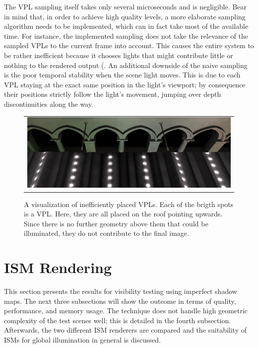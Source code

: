 The VPL sampling itself takes only several microseconds and is negligible. Bear in mind that, in order to achieve high quality levels, a more elaborate sampling algorithm needs to be implemented, which can in fact take most of the available time. For instance, the implemented sampling does not take the relevance of the sampled VPLs to the current frame into account. This causes the entire system to be rather inefficient because it chooses lights that might contribute little or nothing to the rendered output (. An additional downside of the naive sampling is the poor temporal stability when the scene light moves. This is due to each VPL staying at the exact same position in the light's viewport; by consequence their positions strictly follow the light's movement, jumping over depth discontinuities along the way.

\begin{figure}[htb]
\centering
  \begin{tabular}{@{}c@{}}
    \includegraphics[width=1.0\textwidth]{screenshots/RSM_unfavorable} \\
  \end{tabular}
  \caption{A visualization of inefficiently placed VPLs. Each of the brigth spots is a VPL. Here, they are all placed on the roof pointing upwards. Since there is no further geometry above them that could be illuminated, they do not contribute to the final image.}
  \label{fig:results:RSMUnfavorable}
\end{figure}




\section{ISM Rendering}
\label{sec:results:ism}

This section presents the results for visibility testing using imperfect shadow maps. The next three subsections will show the outcome in terms of quality, performance, and memory usage. The technique does not handle high geometric complexity of the test scenes well; this is detailed in the fourth subsection. Afterwards, the two different ISM renderers are compared and the suitability of ISMs for global illumination in general is discussed.


